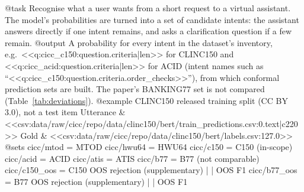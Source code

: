 @task
Recognise what a user wants from a short request to a virtual assistant. The model's probabilities are turned into
a set of candidate intents: the assistant answers directly if one intent remains, and asks a clarification
question if a few remain.
@output
A probability for every intent in the dataset's inventory, e.g.\ <<q:cicc_c150:question.criteria|len>> for CLINC150
and <<q:cicc_acid:question.criteria|len>> for ACID (intent names such as ``<<q:cicc_c150:question.criteria.order_checks>>''),
from which conformal prediction sets are built. The paper's BANKING77 set is not compared
(Table~\ref{tab:deviations}).
@example CLINC150 released training split (CC BY 3.0), not a test item
Utterance & <<csv:data/raw/cicc/repo/data/clinc150/bert/train_predictions.csv:0.text|c220>>
Gold & <<csv:data/raw/cicc/repo/data/clinc150/bert/labels.csv:127.0>>
@sets
cicc/mtod = MTOD
cicc/hwu64 = HWU64
cicc/c150 = C150 (in-scope)
cicc/acid = ACID
cicc/atis = ATIS
cicc/b77 = B77 (not comparable)
cicc/c150_oos = C150 OOS rejection (supplementary) | | OOS F1
cicc/b77_oos = B77 OOS rejection (supplementary) | | OOS F1
